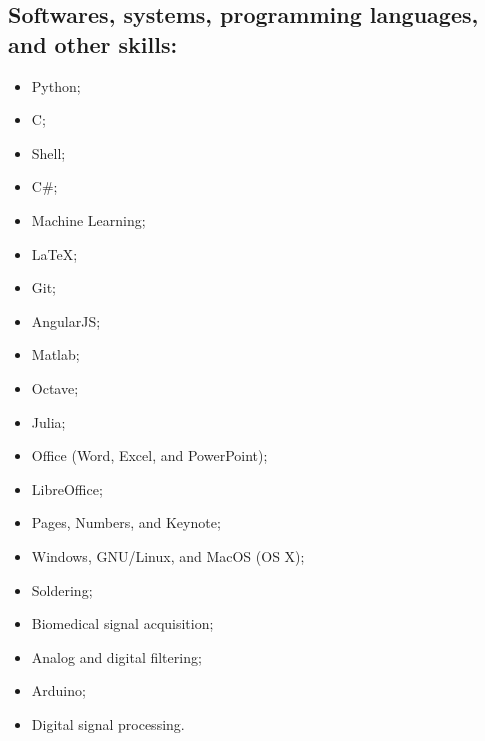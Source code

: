 \documentclass[11pt]{article}
\begin{document}
\subsection{Softwares, systems, programming languages, and other skills:}
\begin{multicols}{3} %
\begin{itemize}
    \item Python;
    \item C;
    \item Shell;
    \item C\#;
    \item Machine Learning;
    \item \LaTeX ;
    \item Git;
    \item AngularJS;
    \item Matlab;
    \item Octave;
    \item Julia;
    \item Office (Word, Excel, and PowerPoint);
    \item LibreOffice;
    \item Pages, Numbers, and Keynote;
    \item Windows, GNU/Linux, and MacOS (OS X);
    \item Soldering;
    \item Biomedical signal acquisition;
    \item Analog and digital filtering;
    \item Arduino;
    \item Digital signal processing.
\end{itemize}
\end{multicols}
\end{document}
